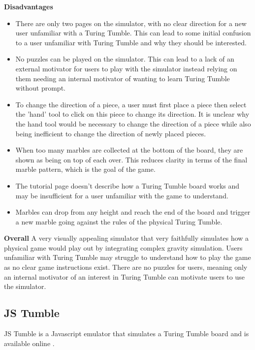 \documentclass{l4proj}
\begin{document}
\textbf{Disadvantages}
\begin{itemize}
    \item There are only two pages on the simulator, with no clear direction for a new user unfamiliar with a Turing Tumble. This can lead to some initial confusion to a user unfamiliar with Turing Tumble and why they should be interested.
    \item No puzzles can be played on the simulator. This can lead to a lack of an external motivator for users to play with the simulator instead relying on them needing an internal motivator of wanting to learn Turing Tumble without prompt.
    \item To change the direction of a piece, a user must first place a piece then select the 'hand' tool to click on this piece to change its direction. It is unclear why the hand tool would be necessary to change the direction of a piece while also being inefficient to change the direction of newly placed pieces.
    \item When too many marbles are collected at the bottom of the board, they are shown as being on top of each over. This reduces clarity in terms of the final marble pattern, which is the goal of the game.
    \item The tutorial page doesn't describe how a Turing Tumble board works and may be insufficient for a user unfamiliar with the game to understand.
    \item Marbles can drop from any height and reach the end of the board and trigger a new marble going against the rules of the physical Turing Tumble.
\end{itemize}

\textbf{Overall}
A very visually appealing simulator that very faithfully simulates how a physical game would play out by integrating complex gravity simulation. Users unfamiliar with Turing Tumble may struggle to understand how to play the game as no clear game instructions exist. There are no puzzles for users, meaning only an internal motivator of an interest in Turing Tumble can motivate users to use the simulator.

\subsection{JS Tumble}
JS Tumble is a Javascript emulator that simulates a Turing Tumble board and is available online \cite{jstumble}.
\end{document}
